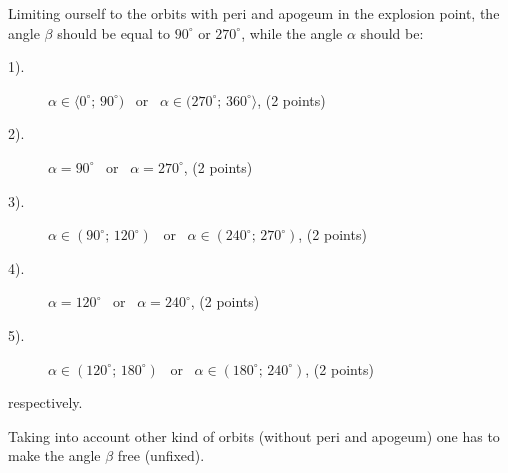 Limiting ourself to the orbits with peri and apogeum in the explosion point,
the angle $\beta$ should be equal to $90^\circ$ or $270^\circ$, while the
angle $\alpha$ should be:

\begin{description}
\item[1).] $\alpha \in \langle 0^\circ;\, 90^\circ)$ \ or \
  $\alpha \in (270^\circ;\, 360^\circ\rangle$, \hfill(2 points)
\item[2).] $\alpha = 90^\circ$ \ or \ $\alpha = 270^\circ$, \hfill(2 points)
\item[3).] $\alpha \in (90^\circ;\, 120^\circ)$ \ or \
  $\alpha \in (240^\circ;\, 270^\circ)$, \hfill(2 points)
\item[4).] $\alpha = 120^\circ$ \ or \ $\alpha = 240^\circ$, \hfill(2 points)
\item[5).] $\alpha \in (120^\circ;\, 180^\circ)$ \ or \
  $\alpha \in (180^\circ;\, 240^\circ)$, \hfill(2 points)
\end{description}
respectively.

Taking into account other kind of orbits (without peri and apogeum) one has to
make the angle $\beta$ free (unfixed).
